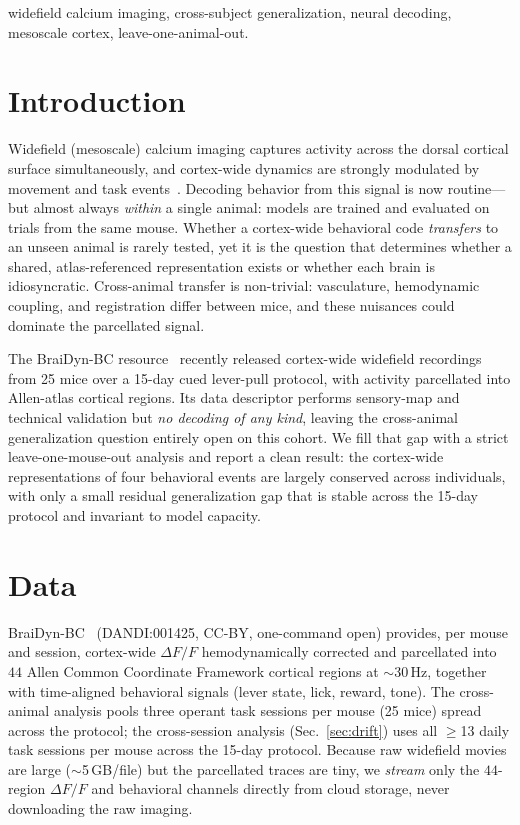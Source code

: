 \documentclass[conference]{IEEEtran}
\begin{document}
\begin{IEEEkeywords}
widefield calcium imaging, cross-subject generalization, neural decoding, mesoscale cortex,
leave-one-animal-out.
\end{IEEEkeywords}

\section{Introduction}
Widefield (mesoscale) calcium imaging captures activity across the dorsal cortical surface
simultaneously, and cortex-wide dynamics are strongly modulated by movement and task
events~\cite{musall,macdowell}. Decoding behavior from this signal is now routine---but
almost always \emph{within} a single animal: models are trained and evaluated on trials from
the same mouse. Whether a cortex-wide behavioral code \emph{transfers} to an unseen animal is
rarely tested, yet it is the question that determines whether a shared, atlas-referenced
representation exists or whether each brain is idiosyncratic. Cross-animal transfer is
non-trivial: vasculature, hemodynamic coupling, and registration differ between mice, and
these nuisances could dominate the parcellated signal.

The BraiDyn-BC resource~\cite{braidyn} recently released cortex-wide widefield recordings from
25 mice over a 15-day cued lever-pull protocol, with activity parcellated into Allen-atlas
cortical regions. Its data descriptor performs sensory-map and technical validation but
\emph{no decoding of any kind}, leaving the cross-animal generalization question entirely open
on this cohort. We fill that gap with a strict leave-one-mouse-out analysis and report a clean
result: the cortex-wide representations of four behavioral events are largely conserved across
individuals, with only a small residual generalization gap that is stable across the 15-day
protocol and invariant to model capacity.

\section{Data}
BraiDyn-BC~\cite{braidyn} (DANDI:001425, CC-BY, one-command open) provides, per mouse and
session, cortex-wide $\Delta F/F$ hemodynamically corrected and parcellated into $44$
Allen Common Coordinate Framework cortical regions at $\sim$30\,Hz, together with
time-aligned behavioral signals (lever state, lick, reward, tone). The cross-animal analysis
pools three operant task sessions per mouse (25 mice) spread across the protocol; the
cross-session analysis (Sec.~\ref{sec:drift}) uses all $\geq$13 daily task sessions per mouse
across the 15-day protocol. Because raw widefield movies are large
($\sim$5\,GB/file) but the parcellated traces are tiny, we \emph{stream} only the $44$-region
$\Delta F/F$ and behavioral channels directly from cloud storage, never downloading the raw
imaging.
\end{document}
